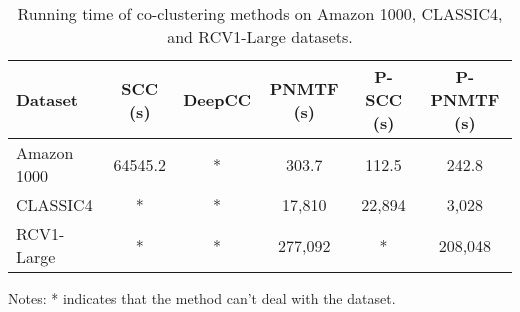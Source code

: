 \begin{table}[htbp]
    \centering
    \caption{Running time of co-clustering methods on Amazon 1000, CLASSIC4, and RCV1-Large datasets.}
    \begin{tabular}{@{} l ccccc @{}}
        \toprule
        Dataset     & SCC (s) & DeepCC & PNMTF (s) & P-SCC (s) & P-PNMTF (s) \\
        \midrule
        Amazon 1000 & 64545.2 & *      & 303.7     & 112.5     & 242.8       \\
        CLASSIC4    & *       & *      & 17,810    & 22,894    & 3,028       \\
        RCV1-Large  & *       & *      & 277,092   & *         & 208,048     \\
        \bottomrule
    \end{tabular}
    \begin{tablenotes}
        \small
        \item Notes: * indicates that the method can't deal with the dataset.
    \end{tablenotes}
\end{table}

